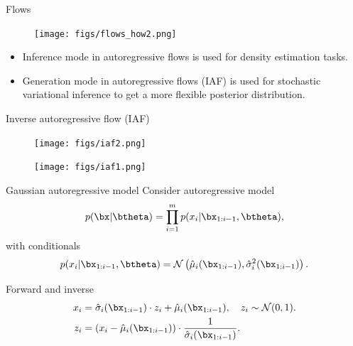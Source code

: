 \begin{frame}{Flows}
	\begin{figure}
		\texttt{[image: figs/flows\_how2.png]}
	\end{figure}
	\begin{itemize}	
		\item Inference mode in autoregressive flows is used for density estimation tasks.
		\item Generation mode in autoregressive flows (IAF) is used for stochastic variational inference to get a more flexible posterior distribution.
	\end{itemize}

\end{frame}
\begin{frame}{Inverse autoregressive flow (IAF)}
	\begin{figure}
		\texttt{[image: figs/iaf2.png]}
	\end{figure}
	\begin{figure}
		\texttt{[image: figs/iaf1.png]}
	\end{figure}

\end{frame}
\begin{frame}{Gaussian autoregressive model}
	Consider autoregressive model
	\[
		p(\bx | \btheta) = \prod_{i=1}^m p(x_i | \bx_{1:i - 1}, \btheta),
	\]
	with conditionals
	\[
		p(x_i | \bx_{1:i - 1}, \btheta) = \mathcal{N} \left(\hat{\mu}_i(\bx_{1:i-1}), \hat{\sigma}^2_i (\bx_{1:i-1})\right).
	\]
	\vspace{-0.5cm}
	\begin{block}{Forward and inverse}
		\vspace{-0.3cm}
		\begin{align*}
			x_i &= \hat{\sigma}_i (\bx_{1:i-1}) \cdot z_i + \hat{\mu}_i(\bx_{1:i-1}), \quad z_i \sim \mathcal{N}(0, 1). \\
			z_i &= \left(x_i - \hat{\mu}_i(\bx_{1:i-1}) \right) \cdot \frac{1}{\hat{\sigma}_i (\bx_{1:i-1}) }.
		\end{align*}
	\end{block}
\end{frame}
